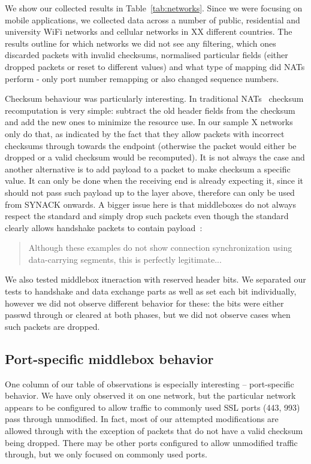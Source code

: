 \documentclass{sig-alternate-10pt}
\begin{document}
We show our collected results in Table~\ref{tab:networks}. Since we were focusing on mobile applications, we collected data across a number of public, residential and university WiFi networks and cellular networks in XX different countries. The results outline for which networks we did not see any filtering, which ones discarded packets with invalid checksums, normalised particular fields (either dropped packets or reset to different values) and what type of mapping did NATs perform - only port number remapping or also changed sequence numbers.

Checksum behaviour was particularly interesting. In traditional NATs~\cite{Egevang:tu} checksum recomputation is very simple: subtract the old header fields from the checksum and add the new ones to minimize the resource use. In our sample X networks only do that, as indicated by the fact that they allow packets with incorrect checksums through towards the endpoint (otherwise the packet would either be dropped or a valid checksum would be recomputed). It is not always the case and another alternative is to add payload to a packet to make checksum a specific value. It can only be done when the receiving end is already expecting it, since it should not pass such payload up to the layer above, therefore can only be used from SYNACK onwards. A bigger issue here is that middleboxes do not always respect the standard and simply drop such packets even though the standard clearly allows handshake packets to contain payload~\cite{Postel:3EDyoxP_,Chu:2011tn}:

\begin{quotation}
    Although these examples do not show connection synchronization using data-carrying segments, this is perfectly legitimate...
\end{quotation}

We also tested middlebox itneraction with reserved header bits. We separated our tests to handshake and data exchange parts as well as set each bit individually, however we did not observe different behavior for these: the bits were either passwd through or cleared at both phases, but we did not observe cases when such packets are dropped.


\subsection{Port-specific middlebox behavior}

One column of our table of observations is especially interesting -- port-specific behavior. We have only observed it on one network, but the particular network appears to be configured to allow traffic to commonly used SSL ports (443, 993) pass through unmodified. In fact, most of our attempted modifications are allowed through with the exception of packets that do not have a valid checksum being dropped. There may be other ports configured to allow unmodified traffic through, but we only focused on commonly used ports.
\end{document}
